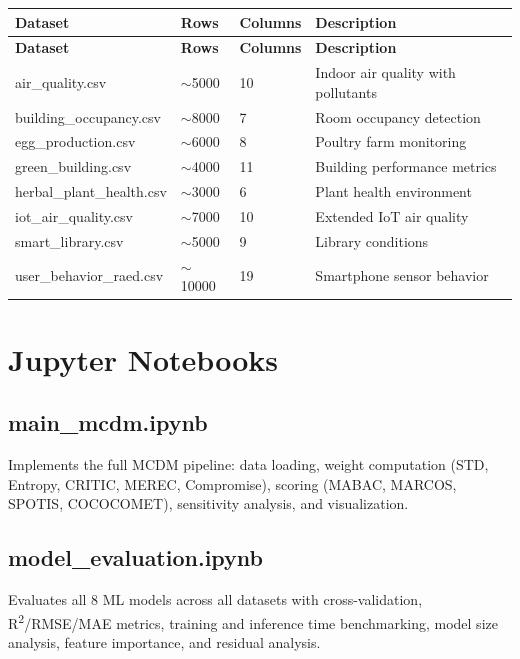 \documentclass[12pt,a4paper,oneside]{report}
\begin{document}
\begin{longtable}{p{3.5cm} p{2.5cm} p{2.5cm} p{7cm}}
\toprule
\textbf{Dataset} & \textbf{Rows} & \textbf{Columns} & \textbf{Description} \\
\midrule
\endfirsthead
\toprule
\textbf{Dataset} & \textbf{Rows} & \textbf{Columns} & \textbf{Description} \\
\midrule
\endhead
\bottomrule
\endfoot
air\_quality.csv & $\sim$5000 & 10 & Indoor air quality with pollutants \\
building\_occupancy.csv & $\sim$8000 & 7 & Room occupancy detection \\
egg\_production.csv & $\sim$6000 & 8 & Poultry farm monitoring \\
green\_building.csv & $\sim$4000 & 11 & Building performance metrics \\
herbal\_plant\_health.csv & $\sim$3000 & 6 & Plant health environment \\
iot\_air\_quality.csv & $\sim$7000 & 10 & Extended IoT air quality \\
smart\_library.csv & $\sim$5000 & 9 & Library conditions \\
user\_behavior\_raed.csv & $\sim$10000 & 19 & Smartphone sensor behavior \\
\bottomrule
\end{longtable}

\section{Jupyter Notebooks}

\subsection{main\_mcdm.ipynb}

Implements the full MCDM pipeline: data loading, weight computation (STD, Entropy, CRITIC, MEREC, Compromise), scoring (MABAC, MARCOS, SPOTIS, COCOCOMET), sensitivity analysis, and visualization.

\subsection{model\_evaluation.ipynb}

Evaluates all 8 ML models across all datasets with cross-validation, R\textsuperscript{2}/RMSE/MAE metrics, training and inference time benchmarking, model size analysis, feature importance, and residual analysis.

\end{document}
